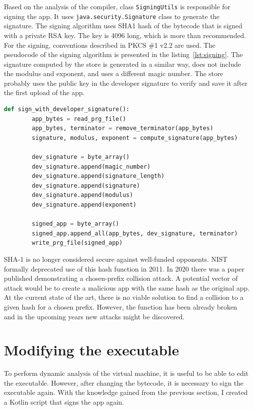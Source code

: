 Based on the analysis of the compiler, class \texttt{SigningUtils} is responsible for signing the app.
It uses \texttt{java.security.Signature} class to generate the signature.
The signing algorithm uses SHA1 hash of the bytecode that is signed with a private RSA key.
The key is 4096 long, which is more than recommended.
For the signing, conventions described in PKCS \#1 v2.2 are used\cite{java-signature,pkcs}.
The pseudocode of the signing algorithm is presented in the listing~\ref{lst:signing}.
The signature computed by the store is generated in a similar way, does not include the modulus and exponent, and uses a different magic number.
The store probably uses the public key in the developer signature to verify and save it after the first upload of the app.
\begin{lstlisting}[caption={Pseudocode of the signing algorithm, developer signature},captionpos=b,label={lst:signing},language=Python]
    def sign_with_developer_signature():
        app_bytes = read_prg_file()
        app_bytes, terminator = remove_terminator(app_bytes)
        signature, modulus, exponent = compute_signature(app_bytes)

        dev_signature = byte_array()
        dev_signature.append(magic_number)
        dev_signature.append(signature_length)
        dev_signature.append(signature)
        dev_signature.append(modulus)
        dev_signature.append(exponent)

        signed_app = byte_array()
        signed_app.append_all(app_bytes, dev_signature, terminator)
        write_prg_file(signed_app)
\end{lstlisting}

SHA-1 is no longer considered secure against well-funded opponents.
NIST formally deprecated use of this hash function in 2011.
In 2020 there was a paper published demonstrating a chosen-prefix collision attack.
A potential vector of attack would be to create a malicious app with the same hash as the original app.
At the current state of the art, there is no viable solution to find a collision to a given hash for a chosen prefix.
However, the function has been already broken and in the upcoming years new attacks might be discovered.

\section{Modifying the executable}
\label{sec:modifying-the-executable}
To perform dynamic analysis of the virtual machine, it is useful to be able to edit the executable.
However, after changing the bytecode, it is necessary to sign the executable again.
With the knowledge gained from the previous section, I created a Kotlin script that signs the app again.

